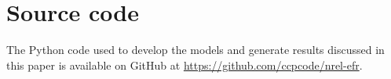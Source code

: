 
\section{Source code}

The Python code used to develop the models and generate results discussed in this paper is available on GitHub at \url{https://github.com/ccpcode/nrel-efr}.
